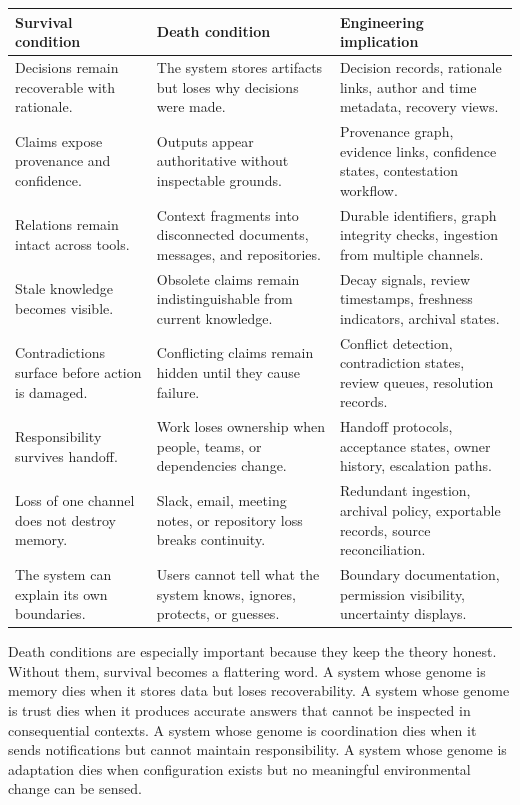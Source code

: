 \documentclass[11pt]{article}
\begin{document}
\begin{longtable}{|p{}|p{}|p{}|}
\hline
\textbf{Survival condition} & \textbf{Death condition} & \textbf{Engineering implication} \\
\hline
Decisions remain recoverable with rationale. & The system stores artifacts but loses why decisions were made. & Decision records, rationale links, author and time metadata, recovery views. \\
\hline
Claims expose provenance and confidence. & Outputs appear authoritative without inspectable grounds. & Provenance graph, evidence links, confidence states, contestation workflow. \\
\hline
Relations remain intact across tools. & Context fragments into disconnected documents, messages, and repositories. & Durable identifiers, graph integrity checks, ingestion from multiple channels. \\
\hline
Stale knowledge becomes visible. & Obsolete claims remain indistinguishable from current knowledge. & Decay signals, review timestamps, freshness indicators, archival states. \\
\hline
Contradictions surface before action is damaged. & Conflicting claims remain hidden until they cause failure. & Conflict detection, contradiction states, review queues, resolution records. \\
\hline
Responsibility survives handoff. & Work loses ownership when people, teams, or dependencies change. & Handoff protocols, acceptance states, owner history, escalation paths. \\
\hline
Loss of one channel does not destroy memory. & Slack, email, meeting notes, or repository loss breaks continuity. & Redundant ingestion, archival policy, exportable records, source reconciliation. \\
\hline
The system can explain its own boundaries. & Users cannot tell what the system knows, ignores, protects, or guesses. & Boundary documentation, permission visibility, uncertainty displays. \\
\hline
\end{longtable}

Death conditions are especially important because they keep the theory honest. Without them, survival becomes a flattering word. A system whose genome is memory dies when it stores data but loses recoverability. A system whose genome is trust dies when it produces accurate answers that cannot be inspected in consequential contexts. A system whose genome is coordination dies when it sends notifications but cannot maintain responsibility. A system whose genome is adaptation dies when configuration exists but no meaningful environmental change can be sensed.
\end{document}
